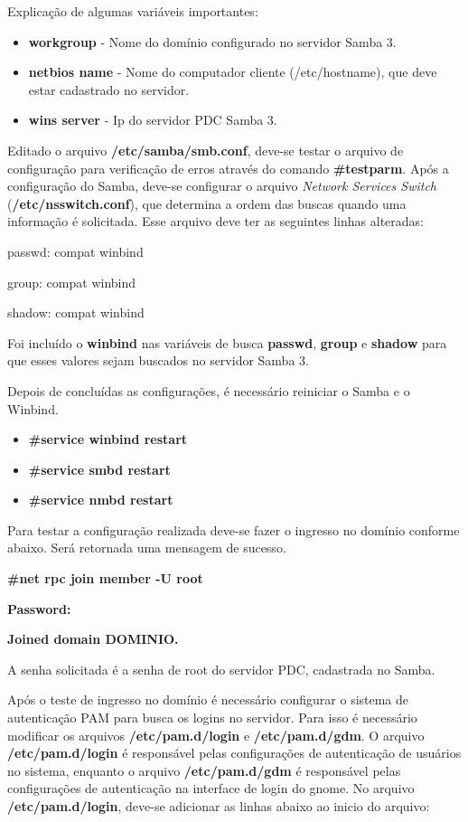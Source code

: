 Explicação de algumas variáveis importantes:
\begin{itemize}
	\item \textbf{workgroup} - Nome do domínio configurado no servidor Samba 3.
	\item \textbf{netbios name} - Nome do computador cliente (/etc/hostname), que deve estar cadastrado no servidor.
	\item \textbf{wins server} - Ip do servidor PDC Samba 3.
\end{itemize}

Editado o arquivo \textbf{/etc/samba/smb.conf}, deve-se testar o arquivo de configuração para verificação de erros através do comando \textbf{\#testparm}.
Após a configuração do Samba, deve-se configurar o arquivo \textit{Network Services Switch} (\textbf{/etc/nsswitch.conf}), que determina a ordem das buscas quando uma informação é solicitada. Esse arquivo deve ter as seguintes linhas alteradas:

  passwd: compat winbind

  group: compat winbind

  shadow: compat winbind

Foi incluído o \textbf{winbind} nas variáveis de busca \textbf{passwd}, \textbf{group} e \textbf{shadow} para que esses valores sejam buscados no servidor Samba 3.

Depois de concluídas as configurações, é necessário reiniciar o Samba e o Winbind.
\begin{itemize}
	\item \textbf{\#service winbind restart}
	\item \textbf{\#service smbd restart}
	\item \textbf{\#service nmbd restart}
\end{itemize}

Para testar a configuração realizada deve-se fazer o ingresso no domínio conforme abaixo. Será retornada uma mensagem de sucesso.

\textbf{\#net rpc join member -U root}

\textbf{Password:}

\textbf{Joined domain DOMINIO.}

A senha solicitada é a senha de root do servidor PDC, cadastrada no Samba.

Após o teste de ingresso no domínio é necessário configurar o sistema de autenticação PAM para busca os logins no servidor. Para isso é necessário modificar os arquivos \textbf{/etc/pam.d/login} e \textbf{/etc/pam.d/gdm}. O arquivo \textbf{/etc/pam.d/login} é responsável pelas configurações de autenticação de usuários no sistema, enquanto o arquivo \textbf{/etc/pam.d/gdm} é responsável pelas configurações de autenticação na interface de login do gnome.
No arquivo \textbf{/etc/pam.d/login}, deve-se adicionar as linhas abaixo ao inicio do arquivo:

